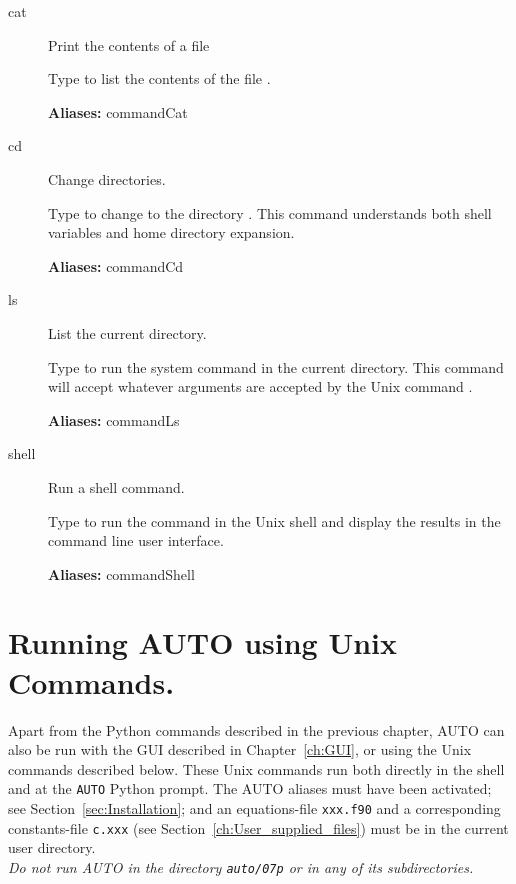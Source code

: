 \documentclass[12pt]{report}
\begin{document}
\begin{description}
\item[cat]
Print the contents of a file

    Type  to list the contents of the file .
    
\textbf{Aliases:} commandCat

\item[cd]
Change directories.
    
    Type  to change to the directory .  This command
    understands both shell variables and home directory expansion.
    
\textbf{Aliases:} commandCd 

\item[ls]
List the current directory.
    
    Type  to run the system  command in the
    current directory.
    This command will accept whatever arguments are accepted by the Unix command
    .
    
\textbf{Aliases:} commandLs

\item[shell]
Run a shell command.
        
    Type  to run the command 
    in the Unix shell and display
    the results in the \AUTO command line user interface.
    
\textbf{Aliases:} commandShell
\end{description}


\chapter{ Running {\cal AUTO} using Unix Commands.} \label{sec:command_mode}
Apart from the Python commands described in the previous chapter,
{\cal AUTO} can also be run with the GUI described in Chapter~\ref{ch:GUI},
or using the Unix commands described below. These Unix commands run both
directly in the shell and at the {\tt AUTO} Python prompt.
The {\cal AUTO} aliases must have been activated; see Section~\ref{sec:Installation}; 
and an equations-file {\tt xxx.f90} 
and a corresponding constants-file {\tt c.xxx} 
(see Section~\ref{ch:User_supplied_files})
must be in the current user directory.
\\
{\it Do not run {\cal AUTO} in the directory {\tt auto/07p} 
or in any of its subdirectories.}
\end{document}
